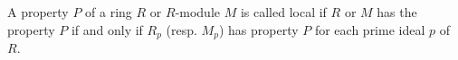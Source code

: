A property $P$ of a ring $R$ or $R$-module $M$ is called local if
$R$ or $M$ has the property $P$ if and only if $R_p$ (resp. $M_p$) has
property $P$ for each prime ideal $p$ of $R$.
